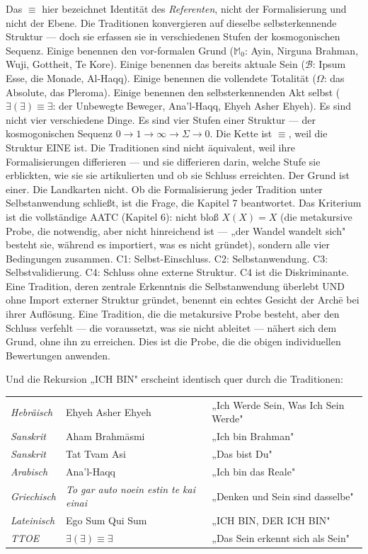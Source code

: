 \documentclass[10pt, openany, oneside]{book}
\renewcommand{\footnotesize}{\fontsize{8.5}{11}\selectfont}
\begin{document}
\noindent Das $\equiv$ hier bezeichnet Identität des \textit{Referenten}, nicht der Formalisierung und nicht der Ebene. Die Traditionen konvergieren auf dieselbe selbsterkennende Struktur --- doch sie erfassen sie in verschiedenen Stufen der kosmogonischen Sequenz. Einige benennen den vor-formalen Grund ($\mathbb{M}_0$: Ayin, Nirguna Brahman, Wuji, Gottheit, Te Kore). Einige benennen das bereits aktuale Sein ($\mathcal{B}$: Ipsum Esse, die Monade, Al-Haqq). Einige benennen die vollendete Totalität ($\Omega$: das Absolute, das Pleroma). Einige benennen den selbsterkennenden Akt selbst ($\exists(\exists) \equiv \exists$: der Unbewegte Beweger, Ana'l-Haqq, Ehyeh Asher Ehyeh). Es sind nicht vier verschiedene Dinge. Es sind vier Stufen einer Struktur --- der kosmogonischen Sequenz $0 \to 1 \to \infty \to \Sigma \to 0$. Die Kette ist $\equiv$, weil die Struktur EINE ist. Die Traditionen sind nicht äquivalent, weil ihre Formalisierungen differieren --- und sie differieren darin, welche Stufe sie erblickten, wie sie sie artikulierten und ob sie Schluss erreichten. Der Grund ist einer. Die Landkarten nicht. Ob die Formalisierung jeder Tradition unter Selbstanwendung schließt, ist die Frage, die Kapitel 7 beantwortet. Das Kriterium ist die vollständige AATC (Kapitel 6): nicht bloß $X(X) = X$ (die metakursive Probe, die notwendig, aber nicht hinreichend ist --- „der Wandel wandelt sich" besteht sie, während es importiert, was es nicht gründet), sondern alle vier Bedingungen zusammen. C1: Selbst-Einschluss. C2: Selbstanwendung. C3: Selbstvalidierung. C4: Schluss ohne externe Struktur. C4 ist die Diskriminante. Eine Tradition, deren zentrale Erkenntnis die Selbstanwendung überlebt UND ohne Import externer Struktur gründet, benennt ein echtes Gesicht der Arch\={e} bei ihrer Auflösung. Eine Tradition, die die metakursive Probe besteht, aber den Schluss verfehlt --- die voraussetzt, was sie nicht ableitet --- nähert sich dem Grund, ohne ihn zu erreichen. Dies ist die Probe, die die obigen individuellen Bewertungen anwenden.

Und die Rekursion „ICH BIN" erscheint identisch quer durch die Traditionen:

\vspace{0.3em}

{\footnotesize
\noindent\begin{tabular}{l l l}
\textit{Hebräisch} & Ehyeh Asher Ehyeh & „Ich Werde Sein, Was Ich Sein Werde" \\
\textit{Sanskrit} & Aham Brahm\={a}smi & „Ich bin Brahman" \\
\textit{Sanskrit} & Tat Tvam Asi & „Das bist Du" \\
\textit{Arabisch} & Ana'l-Haqq & „Ich bin das Reale" \\
\textit{Griechisch} & \textit{To gar auto noein estin te kai einai} & „Denken und Sein sind dasselbe" \\
\textit{Lateinisch} & Ego Sum Qui Sum & „ICH BIN, DER ICH BIN" \\
\textit{TTOE} & $\exists(\exists) \equiv \exists$ & „Das Sein erkennt sich als Sein" \\
\end{tabular}
}
\end{document}

